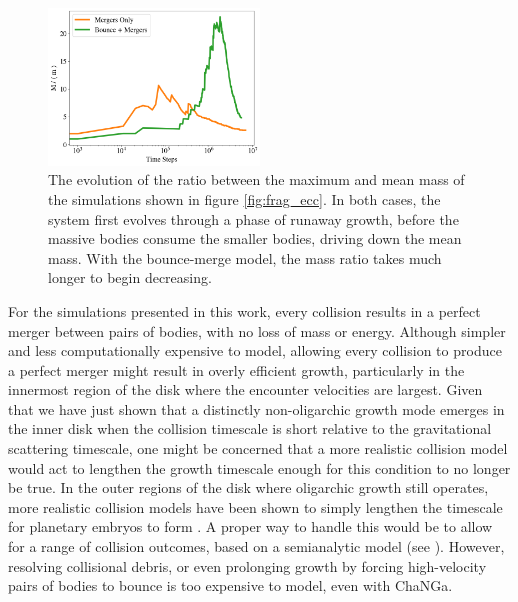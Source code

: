 \begin{figure}
\begin{center}
    \includegraphics[width=0.5\textwidth]{figures/plStip/frag_evo.png}
    \caption{The evolution of the ratio between the maximum and mean mass of the simulations shown in figure \ref{fig:frag_ecc}. 
    In both cases, the system first evolves through a phase of runaway growth, before the massive bodies consume the smaller 
    bodies, driving down the mean mass. With the bounce-merge model, the mass ratio takes much longer to begin decreasing.\label{fig:frag_evo}}
\end{center}
\end{figure}

For the simulations presented in this work, every collision results in a perfect merger between pairs of bodies, with no loss
of mass or energy. Although simpler and less computationally expensive to model, allowing every collision to produce a
perfect merger might result in overly efficient growth, particularly in the innermost region of the disk where the encounter 
velocities are largest. Given that we have just shown that a distinctly non-oligarchic growth mode emerges in the inner disk when the 
collision timescale is short relative to the gravitational scattering timescale, one might be concerned that a more realistic collision model would act 
to lengthen the growth timescale enough for this condition to no longer be true. In the outer regions of the disk where oligarchic growth still 
operates, more realistic collision models have been shown to simply lengthen the timescale for planetary embryos to form 
\cite{wetherill93, leinhardt05}. A proper way to handle this would be to allow for a range of collision outcomes, based on a semianalytic 
model (see \cite{leinhardt12}). However, resolving collisional debris, or even prolonging growth by forcing high-velocity pairs of 
bodies to bounce is too expensive to model, even with {\sc ChaNGa}.

